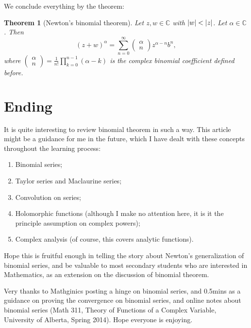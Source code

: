 \documentclass[12pt]{article}
\newtheorem*{theorem}{Theorem}
\begin{document}
    We conclude everything by the theorem:

    \begin{theorem}[Newton's binomial theorem]
        Let $z,w\in\mathbb{C}$ with $\abs{w}<\abs{z}$. Let $\alpha\in\mathbb{C}$. Then \[(z+w)^\alpha=\sum_{n=0}^{\infty}\begin{pmatrix}
            \alpha\\n
        \end{pmatrix}z^{\alpha-n}b^n,\] where $\begin{pmatrix}
            \alpha\\n
        \end{pmatrix}=\displaystyle\frac{1}{n!}\prod_{k=0}^{n-1}(\alpha-k)$ is the complex binomial coefficient defined before.
    \end{theorem}

    \section*{Ending}

    It is quite interesting to review binomial theorem in such a way. This article might be a guidance for me in the future, which I have dealt with these concepts throughout the learning process:\begin{enumerate}
        \item Binomial series;
        \item Taylor series and Maclaurine series;
        \item Convolution on series;
        \item Holomorphic functions (although I make no attention here, it is it the principle assumption on complex powers);
        \item Complex analysis (of course, this covers analytic functions).
    \end{enumerate}

    Hope this is fruitful enough in telling the story about Newton's generalization of binomial series, and be valuable to most secondary students who are interested in Mathematics, as an extension on the discussion of binomial theorem.

    Very thanks to Mathginics posting a hinge on binomial series, and 0.5mins as a guidance on proving the convergence on binomial series, and online notes about binomial series (Math 311, Theory of Functions of a Complex Variable, University of Alberta, Spring 2014). Hope everyone is enjoying.
\end{document}
